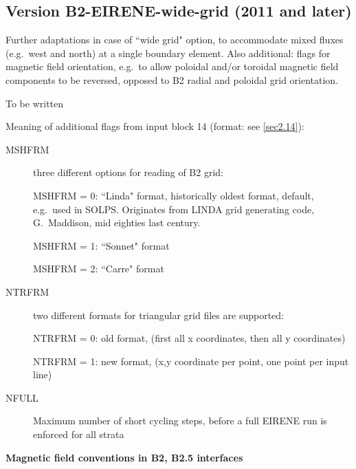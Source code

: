 \subsection{Version B2-EIRENE-wide-grid (2011 and later)} \label{sec2.14.3}

Further adaptations in case of ``wide grid" option, to accommodate   mixed
fluxes (e.g.\ west and north) at a single boundary element.
Also additional: flags for magnetic field orientation, e.g.\ to allow poloidal
and/or toroidal magnetic field components to be reversed, opposed to B2 radial
and poloidal grid orientation.

To be written

Meaning of additional flags from input block 14  (format: see \cref{sec2.14}):
\begin{description}
  \item[MSHFRM] three different options for reading of B2 grid:

        MSHFRM = 0: ``Linda" format, historically oldest format, default, e.g.\ used in
        SOLPS.
        Originates from LINDA grid generating code, G.~Maddison, mid eighties last
        century.

        MSHFRM = 1: ``Sonnet" format

        MSHFRM = 2: ``Carre" format

  \item[NTRFRM] two different formats for triangular grid files are supported:

        NTRFRM = 0:  old format, (first all x coordinates, then all y coordinates)

        NTRFRM = 1:  new format, (x,y coordinate per point, one point per input line)
  \item[NFULL] Maximum number of short cycling steps, before a full EIRENE run is
        enforced for all strata
\end{description}

\textbf{Magnetic field conventions in B2, B2.5 interfaces}

\medskip

